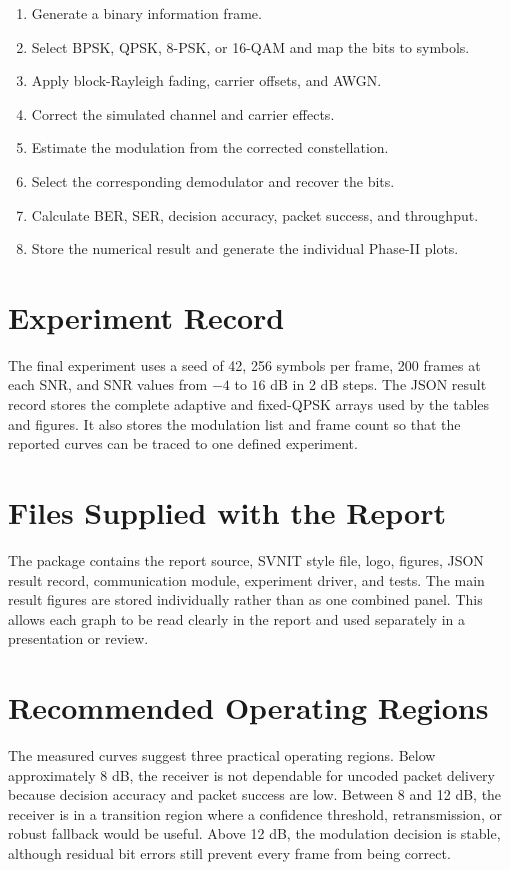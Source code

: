 \documentclass[12pt,twoside,openright]{report}
\begin{document}
\begin{enumerate}
\item Generate a binary information frame.
\item Select BPSK, QPSK, 8-PSK, or 16-QAM and map the bits to symbols.
\item Apply block-Rayleigh fading, carrier offsets, and AWGN.
\item Correct the simulated channel and carrier effects.
\item Estimate the modulation from the corrected constellation.
\item Select the corresponding demodulator and recover the bits.
\item Calculate BER, SER, decision accuracy, packet success, and throughput.
\item Store the numerical result and generate the individual Phase-II plots.
\end{enumerate}

\section{Experiment Record}
The final experiment uses a seed of 42, 256 symbols per frame, 200 frames at
each SNR, and SNR values from $-4$ to $16$ dB in 2 dB steps. The JSON result
record stores the complete adaptive and fixed-QPSK arrays used by the tables
and figures. It also stores the modulation list and frame count so that the
reported curves can be traced to one defined experiment.

\section{Files Supplied with the Report}
The package contains the report source, SVNIT style file, logo, figures,
JSON result record, communication module, experiment driver, and tests. The
main result figures are stored individually rather than as one combined
panel. This allows each graph to be read clearly in the report and used
separately in a presentation or review.

\section{Recommended Operating Regions}
The measured curves suggest three practical operating regions. Below
approximately 8 dB, the receiver is not dependable for uncoded packet
delivery because decision accuracy and packet success are low. Between 8
and 12 dB, the receiver is in a transition region where a confidence
threshold, retransmission, or robust fallback would be useful. Above 12 dB,
the modulation decision is stable, although residual bit errors still
prevent every frame from being correct.
\end{document}
